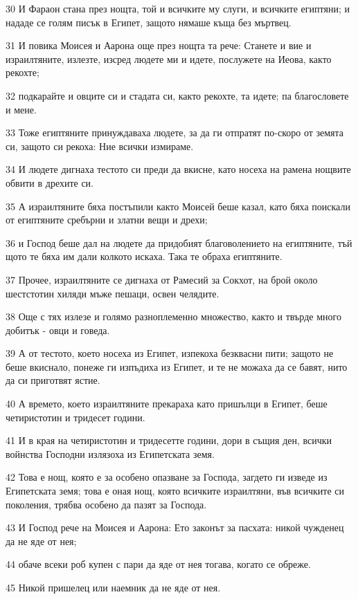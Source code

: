 \par 30 И Фараон стана през нощта, той и всичките му слуги, и всичките египтяни; и нададе се голям писък в Египет, защото нямаше къща без мъртвец.
\par 31 И повика Моисея и Аарона още през нощта та рече: Станете и вие и израилтяните, излезте, изсред людете ми и идете, послужете на Иеова, както рекохте;
\par 32 подкарайте и овците си и стадата си, както рекохте, та идете; па благословете и мене.
\par 33 Тоже египтяните принуждаваха людете, за да ги отпратят по-скоро от земята си, защото си рекоха: Ние всички измираме.
\par 34 И людете дигнаха тестото си преди да вкисне, като носеха на рамена нощвите обвити в дрехите си.
\par 35 А израилтяните бяха постъпили както Моисей беше казал, като бяха поискали от египтяните сребърни и златни вещи и дрехи;
\par 36 и Господ беше дал на людете да придобият благоволението на египтяните, тъй щото те бяха им дали колкото искаха. Така те обраха египтяните.
\par 37 Прочее, израилтяните се дигнаха от Рамесий за Сокхот, на брой около шестстотин хиляди мъже пешаци, освен челядите.
\par 38 Още с тях излезе и голямо разноплеменно множество, както и твърде много добитък - овци и говеда.
\par 39 А от тестото, което носеха из Египет, изпекоха безквасни пити; защото не беше вкиснало, понеже ги изпъдиха из Египет, и те не можаха да се бавят, нито да си приготвят ястие.
\par 40 А времето, което израилтяните прекараха като пришълци в Египет, беше четиристотин и тридесет години.
\par 41 И в края на четиристотин и тридесетте години, дори в същия ден, всички войнства Господни излязоха из Египетската земя.
\par 42 Това е нощ, която е за особено опазване за Господа, загдето ги изведе из Египетската земя; това е оная нощ, която всичките израилтяни, във всичките си поколения, трябва особено да пазят за Господа.
\par 43 И Господ рече на Моисея и Аарона: Ето законът за пасхата: никой чужденец да не яде от нея;
\par 44 обаче всеки роб купен с пари да яде от нея тогава, когато се обреже.
\par 45 Никой пришелец или наемник да не яде от нея.
